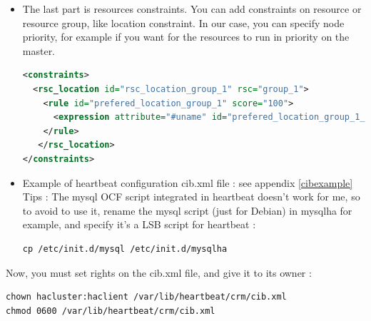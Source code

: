 \documentclass[a4paper,10pt]{report}
\begin{document}
\begin{itemize}
\begin{itemize}
\end{itemize}

\item The last part is resources constraints. You can add constraints on resource or resource group, like location constraint.
In our case, you can specify node priority, for example if you want for the resources to run in priority on the master.
\begin{lstlisting}[language=xml]
<constraints>
  <rsc_location id="rsc_location_group_1" rsc="group_1">
    <rule id="prefered_location_group_1" score="100">
      <expression attribute="#uname" id="prefered_location_group_1_expr" operation="eq" value="NODE-NAME"/>
    </rule>
   </rsc_location>
</constraints>
\end{lstlisting}

\item Example of heartbeat configuration cib.xml file : see appendix \ref{cibexample}\\

Tips : The mysql OCF script integrated in heartbeat doesn't work for me, so to avoid to use it, rename the mysql script (just for Debian) in mysqlha for example, and specify it's a LSB script for heartbeat :
\begin{lstlisting}
cp /etc/init.d/mysql /etc/init.d/mysqlha
\end{lstlisting}


\end{itemize}

Now, you must set rights on the cib.xml file, and give it to its owner :
\begin{lstlisting}
chown hacluster:haclient /var/lib/heartbeat/crm/cib.xml
chmod 0600 /var/lib/heartbeat/crm/cib.xml
\end{lstlisting}
\end{document}
